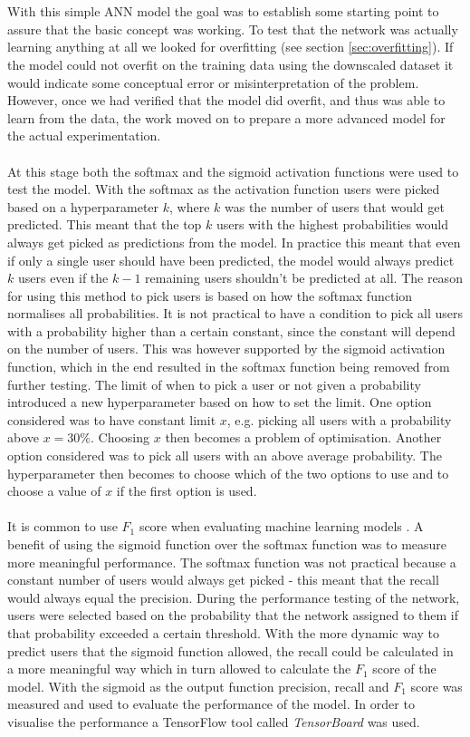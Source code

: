 \\\\
With this simple ANN model the goal was to establish some starting point to assure that the basic concept was working. To test that the network was actually learning anything at all we looked for overfitting (see section \ref{sec:overfitting}). If the model could not overfit on the training data using the downscaled dataset it would indicate some conceptual error or misinterpretation of the problem. However, once we had verified that the model did overfit, and thus was able to learn from the data, the work moved on to prepare a more advanced model for the actual experimentation.
\\\\
At this stage both the softmax and the sigmoid activation functions were used to test the model. With the softmax as the activation function users were picked based on a hyperparameter $k$, where $k$ was the number of users that would get predicted. This meant that the top $k$ users with the highest probabilities would always get picked as predictions from the model. In practice this meant that even if only a single user should have been predicted, the model would always predict $k$ users even if the $k-1$ remaining users shouldn't be predicted at all. The reason for using this method to pick users is based on how the softmax function normalises all probabilities. It is not practical to have a condition to pick all users with a probability higher than a certain constant, since the constant will depend on the number of users. This was however supported by the sigmoid activation function, which in the end resulted in the softmax function being removed from further testing. The limit of when to pick a user or not given a probability introduced a new hyperparameter based on how to set the limit. One option considered was to have constant limit $x$, e.g. picking all users with a probability above $x=30\%$. Choosing $x$ then becomes a problem of optimisation. Another option considered was to pick all users with an above average probability. The hyperparameter then becomes to choose which of the two options to use and to choose a value of $x$ if the first option is used.
\\\\
It is common to use $F_1$ score when evaluating machine learning models \parencite{yang1999re}. A benefit of using the sigmoid function over the softmax function was to measure more meaningful performance. The softmax function was not practical because a constant number of users would always get picked - this meant that the recall would always equal the precision. During the performance testing of the network, users were selected based on the probability that the network assigned to them if that probability exceeded a certain threshold. With the more dynamic way to predict users that the sigmoid function allowed, the recall could be calculated in a more meaningful way which in turn allowed to calculate the $F_1$ score of the model. With the sigmoid as the output function precision, recall and $F_1$ score was measured and used to evaluate the performance of the model. In order to visualise the performance a TensorFlow tool called \textit{TensorBoard} was used.
